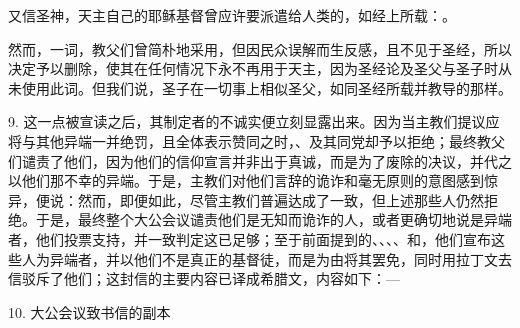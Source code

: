 又信圣神，天主自己的耶稣基督曾应许要派遣给人类的，如经上所载：。\par

然而，一词，教父们曾简朴地采用，但因民众误解而生反感，且不见于圣经，所以决定予以删除，使其在任何情况下永不再用于天主，因为圣经论及圣父与圣子时从未使用此词。但我们说，圣子在一切事上相似圣父，如同圣经所载并教导的那样。\par

9. 这一点被宣读之后，其制定者的不诚实便立刻显露出来。因为当主教们提议应将与其他异端一并绝罚，且全体表示赞同之时，、及其同党却予以拒绝；最终教父们谴责了他们，因为他们的信仰宣言并非出于真诚，而是为了废除的决议，并代之以他们那不幸的异端。于是，主教们对他们言辞的诡诈和毫无原则的意图感到惊异，便说：然而，即便如此，尽管主教们普遍达成了一致，但上述那些人仍然拒绝。于是，最终整个大公会议谴责他们是无知而诡诈的人，或者更确切地说是异端者，他们投票支持，并一致判定这已足够；至于前面提到的、、、、和，他们宣布这些人为异端者，并以他们不是真正的基督徒，而是为由将其罢免，同时用拉丁文去信驳斥了他们；这封信的主要内容已译成希腊文，内容如下：—\par

10. 大公会议致书信的副本\par

